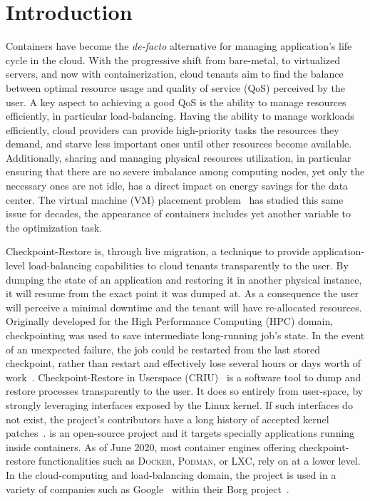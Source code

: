 \chapter{Introduction} \label{chap:introduction}

Containers have become the \textit{de-facto} alternative for managing application's life cycle in the cloud.
With the progressive shift from bare-metal, to virtualized servers, and now with containerization, cloud tenants aim to find the balance between optimal resource usage and quality of service (QoS) perceived by the user.
A key aspect to achieving a good QoS is the ability to manage resources efficiently, in particular load-balancing.
Having the ability to manage workloads efficiently, cloud providers can provide high-priority tasks the resources they demand, and starve less important ones until other resources become available.
Additionally, sharing and managing physical resources utilization, in particular ensuring that there are no severe imbalance among computing nodes, yet only the necessary ones are not idle, has a direct impact on energy savings for the data center.
The virtual machine (VM) placement problem~\cite{Masdari2016,Strunk2012} has studied this same issue for decades, the appearance of containers includes yet another variable to the optimization task. 

Checkpoint-Restore is, through live migration, a technique to provide application-level load-balancing capabilities to cloud tenants transparently to the user.
By dumping the state of an application and restoring it in another physical instance, it will resume from the exact point it was dumped at.
As a consequence the user will perceive a minimal downtime and the tenant will have re-allocated resources.
Originally developed for the High Performance Computing (HPC) domain, checkpointing was used to save intermediate long-running job's state.
In the event of an unexpected failure, the job could be restarted from the last stored checkpoint, rather than restart and effectively lose several hours or days worth of work~\cite{Barker2014}.
Checkpoint-Restore in Userspace (CRIU)~\cite{criu-main-page} is a software tool to dump and restore processes transparently to the user.
It does so entirely from user-space, by strongly leveraging interfaces exposed by the Linux kernel.
If such interfaces do not exist, the project's contributors have a long history of accepted kernel patches~\cite{criu-kernel-patches}.
\criu is an open-source project and it targets specially applications running inside containers.
As of June 2020, most container engines offering checkpoint-restore functionalities such as \textsc{Docker}, \textsc{Podman}, or \textsc{LXC}, rely on \criu at a lower level.
In the cloud-computing and load-balancing domain, the project is used in a variety of companies such as Google~\cite{Tucker18} within their Borg project~\cite{Verma2015}.

